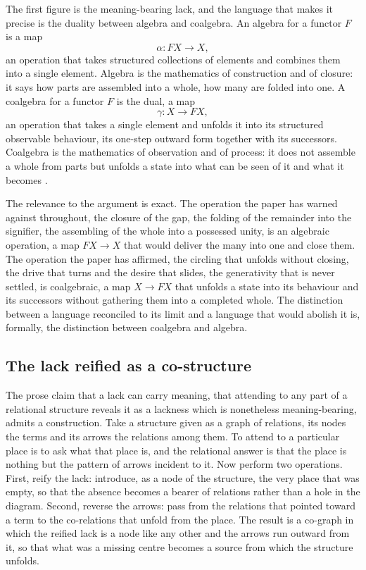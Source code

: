 The first figure is the meaning-bearing lack, and the language that makes it precise is the duality between algebra and coalgebra. An algebra for a functor $F$ is a map
\[
\alpha : F X \longrightarrow X,
\]
an operation that takes structured collections of elements and combines them into a single element. Algebra is the mathematics of construction and of closure: it says how parts are assembled into a whole, how many are folded into one. A coalgebra for a functor $F$ is the dual, a map
\[
\gamma : X \longrightarrow F X,
\]
an operation that takes a single element and unfolds it into its structured observable behaviour, its one-step outward form together with its successors. Coalgebra is the mathematics of observation and of process: it does not assemble a whole from parts but unfolds a state into what can be seen of it and what it becomes \parencite{rutten2000universal,jacobs2016introduction}.

The relevance to the argument is exact. The operation the paper has warned against throughout, the closure of the gap, the folding of the remainder into the signifier, the assembling of the whole into a possessed unity, is an algebraic operation, a map $F X \to X$ that would deliver the many into one and close them. The operation the paper has affirmed, the circling that unfolds without closing, the drive that turns and the desire that slides, the generativity that is never settled, is coalgebraic, a map $X \to F X$ that unfolds a state into its behaviour and its successors without gathering them into a completed whole. The distinction between a language reconciled to its limit and a language that would abolish it is, formally, the distinction between coalgebra and algebra.

\subsection*{The lack reified as a co-structure}

The prose claim that a lack can carry meaning, that attending to any part of a relational structure reveals it as a lackness which is nonetheless meaning-bearing, admits a construction. Take a structure given as a graph of relations, its nodes the terms and its arrows the relations among them. To attend to a particular place is to ask what that place is, and the relational answer is that the place is nothing but the pattern of arrows incident to it. Now perform two operations. First, reify the lack: introduce, as a node of the structure, the very place that was empty, so that the absence becomes a bearer of relations rather than a hole in the diagram. Second, reverse the arrows: pass from the relations that pointed toward a term to the co-relations that unfold from the place. The result is a co-graph in which the reified lack is a node like any other and the arrows run outward from it, so that what was a missing centre becomes a source from which the structure unfolds.

